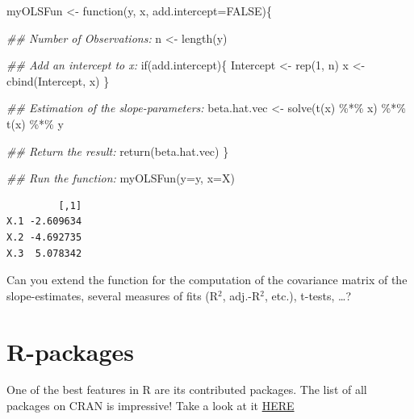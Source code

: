 \documentclass[
  letterpaper,
  DIV=11,
  numbers=noendperiod]{scrreprt}
\newenvironment{Shaded}{\begin{snugshade}}{\end{snugshade}}
\newcommand{\AttributeTok}[1]{\textcolor[rgb]{0.40,0.45,0.13}{#1}}
\newcommand{\ConstantTok}[1]{\textcolor[rgb]{0.56,0.35,0.01}{#1}}
\newcommand{\ControlFlowTok}[1]{\textcolor[rgb]{0.00,0.23,0.31}{#1}}
\newcommand{\DecValTok}[1]{\textcolor[rgb]{0.68,0.00,0.00}{#1}}
\newcommand{\DocumentationTok}[1]{\textcolor[rgb]{0.37,0.37,0.37}{\textit{#1}}}
\newcommand{\FunctionTok}[1]{\textcolor[rgb]{0.28,0.35,0.67}{#1}}
\newcommand{\NormalTok}[1]{\textcolor[rgb]{0.00,0.23,0.31}{#1}}
\newcommand{\OtherTok}[1]{\textcolor[rgb]{0.00,0.23,0.31}{#1}}
\newcommand{\SpecialCharTok}[1]{\textcolor[rgb]{0.37,0.37,0.37}{#1}}
\theoremstyle{definition}
\theoremstyle{plain}
\theoremstyle{plain}
\theoremstyle{remark}
\begin{document}
\begin{Shaded}
\begin{Highlighting}[]
\NormalTok{myOLSFun }\OtherTok{\textless{}{-}} \ControlFlowTok{function}\NormalTok{(y, x, }\AttributeTok{add.intercept=}\ConstantTok{FALSE}\NormalTok{)\{}
  
  \DocumentationTok{\#\# Number of Observations:}
\NormalTok{  n         }\OtherTok{\textless{}{-}} \FunctionTok{length}\NormalTok{(y)}
  
  \DocumentationTok{\#\# Add an intercept to x:}
  \ControlFlowTok{if}\NormalTok{(add.intercept)\{}
\NormalTok{    Intercept }\OtherTok{\textless{}{-}} \FunctionTok{rep}\NormalTok{(}\DecValTok{1}\NormalTok{, n)}
\NormalTok{    x         }\OtherTok{\textless{}{-}} \FunctionTok{cbind}\NormalTok{(Intercept, x)}
\NormalTok{  \}}
  
  \DocumentationTok{\#\# Estimation of the slope{-}parameters:}
\NormalTok{  beta.hat.vec }\OtherTok{\textless{}{-}} \FunctionTok{solve}\NormalTok{(}\FunctionTok{t}\NormalTok{(x) }\SpecialCharTok{\%*\%}\NormalTok{ x) }\SpecialCharTok{\%*\%} \FunctionTok{t}\NormalTok{(x) }\SpecialCharTok{\%*\%}\NormalTok{ y}
  
  \DocumentationTok{\#\# Return the result:}
  \FunctionTok{return}\NormalTok{(beta.hat.vec)}
\NormalTok{\}}

\DocumentationTok{\#\# Run the function:}
\FunctionTok{myOLSFun}\NormalTok{(}\AttributeTok{y=}\NormalTok{y, }\AttributeTok{x=}\NormalTok{X)}
\end{Highlighting}
\end{Shaded}

\begin{verbatim}
         [,1]
X.1 -2.609634
X.2 -4.692735
X.3  5.078342
\end{verbatim}

\hfill\break

Can you extend the function for the computation of the covariance matrix
of the slope-estimates, several measures of fits (R\(^2\), adj.-R\(^2\),
etc.), t-tests, \ldots?

\hypertarget{r-packages}{%
\section{R-packages}\label{r-packages}}

One of the best features in R are its contributed packages. The list of
all packages on CRAN is impressive! Take a look at it
\href{https://cran.r-project.org/web/packages/available_packages_by_name.html}{HERE}
\end{document}

